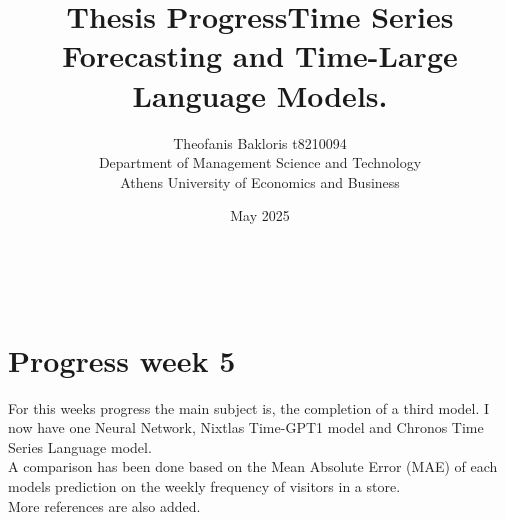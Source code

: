 \documentclass{article}
\title{\textbf{Thesis Progress}}
\author{Theofanis Bakloris t8210094\\
Department of Management Science and Technology\\
Athens University of Economics and Business}
\date{May 2025}
\begin{document}

\maketitle

\title{\textbf{Time Series Forecasting and Time-Large Language Models.}}
\\

\section{Progress week 5}

For this weeks progress the main subject is, the completion of a third model. I now have one Neural Network, Nixtlas Time-GPT1 model and Chronos Time Series Language model. \\
A comparison has been done based on the Mean Absolute Error (MAE) of each models prediction on the weekly frequency of visitors in a store.
\\
More references are also added.



\nocite{*}
\end{document}
